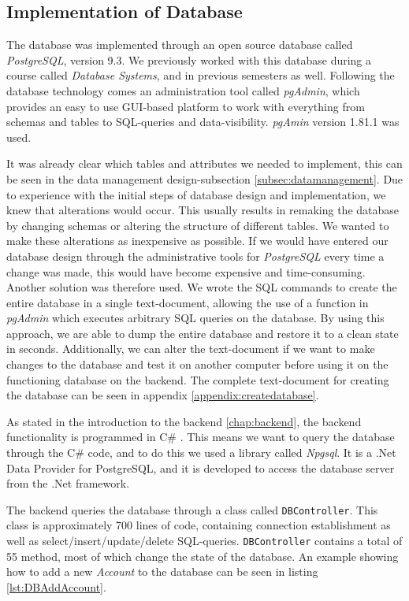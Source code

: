 \subsection{Implementation of Database}
\label{subsec:dbImpl}
The database was implemented through an open source database called \textit{PostgreSQL}\cite{postgreSQL}, version 9.3. We previously worked with this database during a course called \textit{Database Systems}, and in previous semesters as well. Following the database technology comes an administration tool called \textit{pgAdmin}\cite{pgAdmin}, which provides an easy to use GUI-based platform to work with everything from schemas and tables to SQL-queries and data-visibility. \textit{pgAmin} version 1.81.1 was used.

It was already clear which tables and attributes we needed to implement, this can be seen in the data management design-subsection \ref{subsec:datamanagement}. Due to experience with the initial steps of database design and implementation, we knew that alterations would occur. This usually results in remaking the database by changing schemas or altering the structure of different tables. We wanted to make these alterations as inexpensive as possible. If we would have entered our database design through the administrative tools for \textit{PostgreSQL} every time a change was made, this would have become expensive and time-consuming. Another solution was therefore used. We wrote the SQL commands to create the entire database in a single text-document, allowing the use of a function in \textit{pgAdmin} which executes arbitrary SQL queries on the database. By using this approach, we are able to dump the entire database and restore it to a clean state in seconds. Additionally, we can alter the text-document if we want to make changes to the database and test it on another computer before using it on the functioning database on the backend. The complete text-document for creating the database can be seen in appendix \ref{appendix:createdatabase}. 

As stated in the introduction to the backend \ref{chap:backend}, the backend functionality is programmed in C\# . This means we want to query the database through the C\# code, and to do this we used a library called \textit{Npgsql}\cite{npgsql}. It is a .Net Data Provider for PostgreSQL, and it is developed to access the database server from the .Net framework\cite{npgsql}. 

The backend queries the database through a class called \texttt{DBController}. This class is approximately 700 lines of code, containing connection establishment as well as select/insert/update/delete SQL-queries. \texttt{DBController} contains a total of 55 method, most of which change the state of the database. An example showing how to add a new \textit{Account} to the database can be seen in listing \ref{lst:DBAddAccount}.

